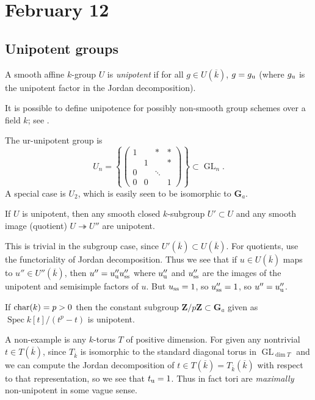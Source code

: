 \documentclass[10pt]{article}
\newcommand{\ZZ}{\mathbf{Z}}
\newcommand{\GL}{\operatorname{GL}}
\renewcommand{\(}{\left(}
\renewcommand{\)}{\right)}
\renewcommand{\bar}{\overline}
\newcommand{\Spec}{\operatorname{Spec}}
\newcommand{\onto}{\twoheadrightarrow }
\numberwithin{thm}{subsection}
\begin{document}
\section{February 12}
\subsection{Unipotent groups}
\begin{defn}
A smooth affine $k$-group $U$ is \textit{unipotent} if for all
$g\in U(\bar k)$, $g=g_{\rm{u}}$ (where $g_{\rm{u}}$ is the unipotent factor in the Jordan decomposition).
\end{defn}
\begin{rem}
It is possible to define unipotence for possibly non-smooth group schemes
over a field $k$; see \cite[XVII, 1.3, 3.5(i)-(v)]{sga3}.
\end{rem}
\begin{ex}
The ur-unipotent group is
\[U_n=\left\{\(\begin{smallmatrix}1&&*&*\\
&1&&*\\
0&&\ddots\\
0&0&&1\end{smallmatrix}\)\right\}\subset\GL_n.\]
A special case is $U_2$, which is easily seen to be isomorphic to $\mathbf{G}_a$.
\end{ex}
\begin{ex}\label{unipotentexample}If $U$ is unipotent, then any smooth closed $k$-subgroup $U'\subset U$
and any smooth image (quotient) $U\onto U''$ are unipotent.

This is trivial in the subgroup case, since $U'(\bar k)\subset U(\bar k)$.
For quotients, use the functoriality of Jordan decomposition.
Thus we see that if $u\in U(\bar k)$
maps to $u''\in U''(\bar k)$,
then $u''=u''_{\rm{u}}u''_{\rm{ss}}$ where $u''_{\rm{u}}$ and $u''_{\rm{ss}}$ are the images
of the unipotent and semisimple factors of $u$.
But $u_{\rm{ss}}=1$, so $u''_{\rm{ss}}=1$, so $u''=u''_{\rm{u}}$.
\end{ex}
\begin{ex}If ${\rm{char}}(k)=p>0$
then the constant subgroup $\ZZ/p\ZZ\subset \mathbf{G}_a$
given as $\Spec k[t]/(t^p-t)$
is unipotent. 
\end{ex}
\begin{ex} A non-example is any $k$-torus $T$ of positive dimension.
For given any nontrivial $t\in T(\bar k)$, since $T_{\bar k}$ is isomorphic
to the standard diagonal torus in $\GL_{\dim T}$
and we can compute the Jordan decomposition
of $t\in T(\bar k)=T_{\bar k}(\bar k)$
with respect to that representation,
so we see that $t_{\rm{u}}=1$.
Thus in fact tori are \textit{maximally} non-unipotent in some vague sense.
\end{ex}
\end{document}

